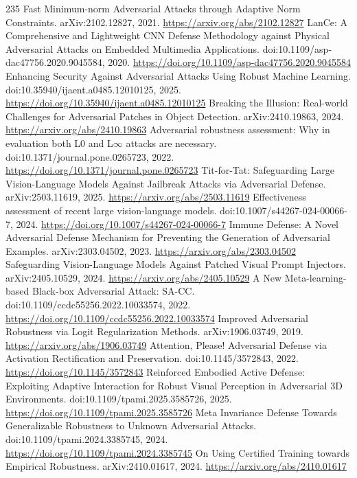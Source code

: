 \documentclass[11pt]{article}
\begin{document}
\begin{thebibliography}{235}
 Fast Minimum-norm Adversarial Attacks through Adaptive Norm Constraints. arXiv:2102.12827, 2021. \url{https://arxiv.org/abs/2102.12827}
 LanCe: A Comprehensive and Lightweight CNN Defense Methodology against Physical Adversarial Attacks on Embedded Multimedia Applications. doi:10.1109/asp-dac47756.2020.9045584, 2020. \url{https://doi.org/10.1109/asp-dac47756.2020.9045584}
 Enhancing Security Against Adversarial Attacks Using Robust Machine Learning. doi:10.35940/ijaent.a0485.12010125, 2025. \url{https://doi.org/10.35940/ijaent.a0485.12010125}
 Breaking the Illusion: Real-world Challenges for Adversarial Patches in Object Detection. arXiv:2410.19863, 2024. \url{https://arxiv.org/abs/2410.19863}
 Adversarial robustness assessment: Why in evaluation both L0 and L$\infty$ attacks are necessary. doi:10.1371/journal.pone.0265723, 2022. \url{https://doi.org/10.1371/journal.pone.0265723}
 Tit-for-Tat: Safeguarding Large Vision-Language Models Against Jailbreak Attacks via Adversarial Defense. arXiv:2503.11619, 2025. \url{https://arxiv.org/abs/2503.11619}
 Effectiveness assessment of recent large vision-language models. doi:10.1007/s44267-024-00066-7, 2024. \url{https://doi.org/10.1007/s44267-024-00066-7}
 Immune Defense: A Novel Adversarial Defense Mechanism for Preventing the Generation of Adversarial Examples. arXiv:2303.04502, 2023. \url{https://arxiv.org/abs/2303.04502}
 Safeguarding Vision-Language Models Against Patched Visual Prompt Injectors. arXiv:2405.10529, 2024. \url{https://arxiv.org/abs/2405.10529}
 A New Meta-learning-based Black-box Adversarial Attack: SA-CC. doi:10.1109/ccdc55256.2022.10033574, 2022. \url{https://doi.org/10.1109/ccdc55256.2022.10033574}
 Improved Adversarial Robustness via Logit Regularization Methods. arXiv:1906.03749, 2019. \url{https://arxiv.org/abs/1906.03749}
 Attention, Please! Adversarial Defense via Activation Rectification and Preservation. doi:10.1145/3572843, 2022. \url{https://doi.org/10.1145/3572843}
 Reinforced Embodied Active Defense: Exploiting Adaptive Interaction for Robust Visual Perception in Adversarial 3D Environments. doi:10.1109/tpami.2025.3585726, 2025. \url{https://doi.org/10.1109/tpami.2025.3585726}
 Meta Invariance Defense Towards Generalizable Robustness to Unknown Adversarial Attacks. doi:10.1109/tpami.2024.3385745, 2024. \url{https://doi.org/10.1109/tpami.2024.3385745}
 On Using Certified Training towards Empirical Robustness. arXiv:2410.01617, 2024. \url{https://arxiv.org/abs/2410.01617}

\end{thebibliography}
\end{document}
